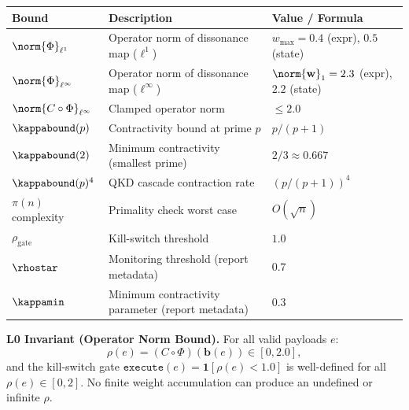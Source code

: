 \documentclass[11pt,letterpaper]{article}
\theoremstyle{remark}
\newcommand{\rhogate}{\rho_{\mathrm{gate}}}
\newcommand{\rhosys}{\rho}
\begin{document}
\begin{center}
\begin{tabularx}{\textwidth}{lXl}
\toprule
\textbf{Bound} & \textbf{Description} & \textbf{Value / Formula} \\
\midrule
$\norm{\Phi}_{\ell^1}$  & Operator norm of dissonance map ($\ell^1$) &
  $w_{\max} = 0.4$ (expr), $0.5$ (state) \\
$\norm{\Phi}_{\ell^\infty}$ & Operator norm of dissonance map ($\ell^\infty$) &
  $\norm{\mathbf{w}}_1 = 2.3$ (expr), $2.2$ (state) \\
$\norm{C \circ \Phi}_{\ell^\infty}$ & Clamped operator norm &
  $\leq 2.0$ \\
$\kappabound(p)$ & Contractivity bound at prime $p$ &
  $p/(p+1)$ \\
$\kappabound(2)$ & Minimum contractivity (smallest prime) &
  $2/3 \approx 0.667$ \\
$\kappabound(p)^4$ & QKD cascade contraction rate &
  $(p/(p+1))^4$ \\
$\pi(n)$ complexity & Primality check worst case &
  $O(\sqrt{n})$ \\
$\rhogate$ & Kill-switch threshold &
  $1.0$ \\
$\rhostar$ & Monitoring threshold (report metadata) &
  $0.7$ \\
$\kappamin$ & Minimum contractivity parameter (report metadata) &
  $0.3$ \\
\bottomrule
\end{tabularx}
\end{center}

\bigskip
\begin{invariantbox}
\textbf{L0 Invariant (Operator Norm Bound).}
For all valid payloads $e$:
\[
  \rhosys(e) = (C \circ \Phi)(\mathbf{b}(e)) \in [0, 2.0],
\]
and the kill-switch gate $\texttt{execute}(e) = \mathbf{1}[\rhosys(e) < 1.0]$
is well-defined for all $\rhosys(e) \in [0,2]$.
No finite weight accumulation can produce an undefined or infinite $\rhosys$.
\end{invariantbox}

\nocite{*}
  

\end{document}
